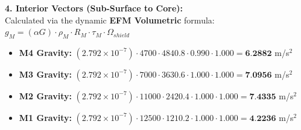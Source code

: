 \documentclass[11pt, a4paper]{article}
\begin{document}
  \vspace{0.5em}
  \noindent \textbf{4. Interior Vectors (Sub-Surface to Core):} \\[0.5em]
  \hspace*{1em} Calculated via the dynamic \textbf{EFM Volumetric} formula: $g_M = (\alpha G) \cdot \rho_{M} \cdot R_M \cdot \tau_M \cdot \Omega_{shield}$
  \begin{itemize}
    \item \textbf{M4 Gravity:} $(2.792 \times 10^{-7}) \cdot 4700 \cdot 4840.8 \cdot 0.990 \cdot 1.000 = \textbf{6.2882}$ m/s$^2$
    \item \textbf{M3 Gravity:} $(2.792 \times 10^{-7}) \cdot 7000 \cdot 3630.6 \cdot 1.000 \cdot 1.000 = \textbf{7.0956}$ m/s$^2$
    \item \textbf{M2 Gravity:} $(2.792 \times 10^{-7}) \cdot 11000 \cdot 2420.4 \cdot 1.000 \cdot 1.000 = \textbf{7.4335}$ m/s$^2$
    \item \textbf{M1 Gravity:} $(2.792 \times 10^{-7}) \cdot 12500 \cdot 1210.2 \cdot 1.000 \cdot 1.000 = \textbf{4.2236}$ m/s$^2$
  \end{itemize}
\end{document}
